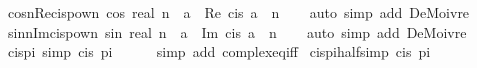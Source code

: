 \begin{isabellebody}
\endisatagproof
{\isafoldproof}%
%
\isadelimproof
\isanewline
%
\endisadelimproof
\isanewline
{}\isamarkupfalse%
\ cos{\isacharunderscore}{\kern0pt}n{\isacharunderscore}{\kern0pt}Re{\isacharunderscore}{\kern0pt}cis{\isacharunderscore}{\kern0pt}pow{\isacharunderscore}{\kern0pt}n{\isacharcolon}{\kern0pt}\ {\isachardoublequoteopen}cos\ {\isacharparenleft}{\kern0pt}real\ n\ {\isacharasterisk}{\kern0pt}\ a{\isacharparenright}{\kern0pt}\ {\isacharequal}{\kern0pt}\ Re\ {\isacharparenleft}{\kern0pt}cis\ a\ {\isacharcircum}{\kern0pt}\ n{\isacharparenright}{\kern0pt}{\isachardoublequoteclose}\isanewline
%
\isadelimproof
\ \ %
\endisadelimproof
%
\isatagproof
{}\isamarkupfalse%
\ {\isacharparenleft}{\kern0pt}auto\ simp\ add{\isacharcolon}{\kern0pt}\ DeMoivre{\isacharparenright}{\kern0pt}%
\endisatagproof
{\isafoldproof}%
%
\isadelimproof
\isanewline
%
\endisadelimproof
\isanewline
{}\isamarkupfalse%
\ sin{\isacharunderscore}{\kern0pt}n{\isacharunderscore}{\kern0pt}Im{\isacharunderscore}{\kern0pt}cis{\isacharunderscore}{\kern0pt}pow{\isacharunderscore}{\kern0pt}n{\isacharcolon}{\kern0pt}\ {\isachardoublequoteopen}sin\ {\isacharparenleft}{\kern0pt}real\ n\ {\isacharasterisk}{\kern0pt}\ a{\isacharparenright}{\kern0pt}\ {\isacharequal}{\kern0pt}\ Im\ {\isacharparenleft}{\kern0pt}cis\ a\ {\isacharcircum}{\kern0pt}\ n{\isacharparenright}{\kern0pt}{\isachardoublequoteclose}\isanewline
%
\isadelimproof
\ \ %
\endisadelimproof
%
\isatagproof
{}\isamarkupfalse%
\ {\isacharparenleft}{\kern0pt}auto\ simp\ add{\isacharcolon}{\kern0pt}\ DeMoivre{\isacharparenright}{\kern0pt}%
\endisatagproof
{\isafoldproof}%
%
\isadelimproof
\isanewline
%
\endisadelimproof
\isanewline
{}\isamarkupfalse%
\ cis{\isacharunderscore}{\kern0pt}pi\ {\isacharbrackleft}{\kern0pt}simp{\isacharbrackright}{\kern0pt}{\isacharcolon}{\kern0pt}\ {\isachardoublequoteopen}cis\ pi\ {\isacharequal}{\kern0pt}\ {\isacharminus}{\kern0pt}{}{\isachardoublequoteclose}\isanewline
%
\isadelimproof
\ \ %
\endisadelimproof
%
\isatagproof
{}\isamarkupfalse%
\ {\isacharparenleft}{\kern0pt}simp\ add{\isacharcolon}{\kern0pt}\ complex{\isacharunderscore}{\kern0pt}eq{\isacharunderscore}{\kern0pt}iff{\isacharparenright}{\kern0pt}%
\endisatagproof
{\isafoldproof}%
%
\isadelimproof
\isanewline
%
\endisadelimproof
\isanewline
{}\isamarkupfalse%
\ cis{\isacharunderscore}{\kern0pt}pi{\isacharunderscore}{\kern0pt}half{\isacharbrackleft}{\kern0pt}simp{\isacharbrackright}{\kern0pt}{\isacharcolon}{\kern0pt}\ {\isachardoublequoteopen}cis\ {\isacharparenleft}{\kern0pt}pi\ {\isacharslash}{\kern0pt}\ {}{\isacharparenright}{\kern0pt}\ {\isacharequal}{\kern0pt}\ {\isasymi}{\isachardoublequoteclose}\isanewline

\end{isabellebody}
